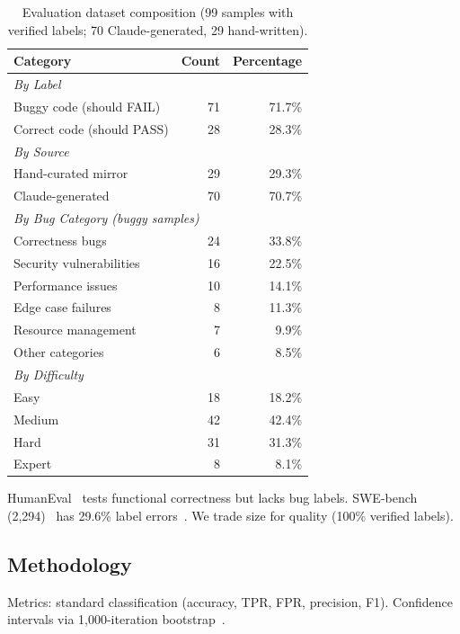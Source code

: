 \documentclass[10pt,twocolumn]{article}
\begin{document}
\begin{table}[t]
\centering
\caption{Evaluation dataset composition (99 samples with verified labels; 70 Claude-generated, 29 hand-written).}
\label{tab:dataset}
\small
\begin{tabular}{@{}lrr@{}}
\toprule
\textbf{Category} & \textbf{Count} & \textbf{Percentage} \\
\midrule
\multicolumn{3}{l}{\textit{By Label}} \\
Buggy code (should FAIL) & 71 & 71.7\% \\
Correct code (should PASS) & 28 & 28.3\% \\
\midrule
\multicolumn{3}{l}{\textit{By Source}} \\
Hand-curated mirror & 29 & 29.3\% \\
Claude-generated & 70 & 70.7\% \\
\midrule
\multicolumn{3}{l}{\textit{By Bug Category (buggy samples)}} \\
Correctness bugs & 24 & 33.8\% \\
Security vulnerabilities & 16 & 22.5\% \\
Performance issues & 10 & 14.1\% \\
Edge case failures & 8 & 11.3\% \\
Resource management & 7 & 9.9\% \\
Other categories & 6 & 8.5\% \\
\midrule
\multicolumn{3}{l}{\textit{By Difficulty}} \\
Easy & 18 & 18.2\% \\
Medium & 42 & 42.4\% \\
Hard & 31 & 31.3\% \\
Expert & 8 & 8.1\% \\
\bottomrule
\end{tabular}
\end{table}

HumanEval~\cite{chen2021humaneval} tests functional correctness but lacks bug labels. SWE-bench (2,294)~\cite{jimenez2024swebench} has 29.6\% label errors~\cite{xia2025swebench}. We trade size for quality (100\% verified labels).

\subsection{Methodology}

Metrics: standard classification (accuracy, TPR, FPR, precision, F1). Confidence intervals via 1,000-iteration bootstrap~\cite{efron1994bootstrap}.
\end{document}
